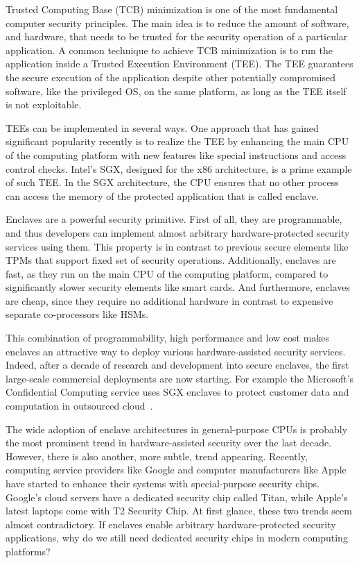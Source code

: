 
\vspace{10pt}

Trusted Computing Base (TCB) minimization is one of the most fundamental computer security principles. The main idea is to reduce the amount of software, and hardware, that needs to be trusted for the security operation of a particular application. A common technique to achieve TCB minimization is to run the application inside a Trusted Execution Environment (TEE). The TEE guarantees the secure execution of the application despite other potentially compromised software, like the privileged OS, on the same platform, as long as the TEE itself is not exploitable. 

TEEs can be implemented in several ways. One approach that has gained significant popularity recently is to realize the TEE by enhancing the main CPU of the computing platform with new features like special instructions and access control checks. Intel's SGX, designed for the x86 architecture, is a prime example of such TEE. In the SGX architecture, the CPU ensures that no other process can access the memory of the protected application that is called enclave. 

Enclaves are a powerful security primitive. First of all, they are programmable, and thus developers can implement almost arbitrary hardware-protected security services using them. This property is in contrast to previous secure elements like TPMs that support fixed set of security operations. Additionally, enclaves are fast, as they run on the main CPU of the computing platform, compared to significantly slower security elements like smart cards. And furthermore, enclaves are cheap, since they require no additional hardware in contrast to expensive separate co-processors like HSMs. 

This combination of programmability, high performance and low cost makes enclaves an attractive way to deploy various hardware-assisted security services. Indeed, after a decade of research and development into secure enclaves, the first large-scale commercial deployments are now starting. For example the Microsoft's Confidential Computing service uses SGX enclaves to protect customer data and computation in outsourced cloud~\cite{russinovich2017introducing}.

The wide adoption of enclave architectures in general-purpose CPUs is probably the most prominent trend in hardware-assisted security over the last decade. However, there is also another, more subtle, trend appearing. Recently, computing service providers like Google and computer manufacturers like Apple have started to enhance their systems with special-purpose security chips. Google's cloud servers have a dedicated security chip called Titan, while Apple's latest laptops come with T2 Security Chip. At first glance, these two trends seem almost contradictory. If enclaves enable arbitrary hardware-protected security applications, why do we still need dedicated security chips in modern computing platforms? 

